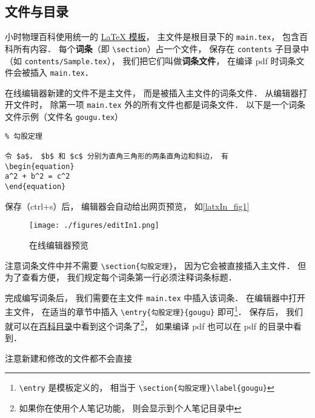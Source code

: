 

\subsection{文件与目录}

小时物理百科使用统一的 \href{https://github.com/MacroUniverse/PhysWiki}{LaTeX 模板}， 主文件是根目录下的 \lstinline|main.tex|， 包含百科所有内容． 每个\textbf{词条}（即 \lstinline|\section|）占一个文件， 保存在 \lstinline|contents| 子目录中 （如 \lstinline|contents/Sample.tex|）， 我们把它们叫做\textbf{词条文件}， 在编译 pdf 时词条文件会被插入 \lstinline|main.tex|．

在线编辑器新建的文件不是主文件， 而是被插入主文件的词条文件． 从编辑器打开文件时， 除第一项 \lstinline|main.tex| 外的所有文件也都是词条文件． 以下是一个词条文件示例（文件名 \lstinline|gougu.tex|）

\begin{lstlisting}
% 勾股定理

令 $a$， $b$ 和 $c$ 分别为直角三角形的两条直角边和斜边， 有
\begin{equation}
a^2 + b^2 = c^2
\end{equation}
\end{lstlisting}
保存（ctrl+s）后， 编辑器会自动给出网页预览， 如\autoref{latxIn_fig1}
\begin{figure}[ht]
\centering
\texttt{[image: ./figures/editIn1.png]}
\caption{在线编辑器预览} \label{editIn_fig1}
\end{figure}

注意词条文件中并不需要 \lstinline|\section{勾股定理}|， 因为它会被直接插入主文件． 但为了查看方便， 我们规定每个词条第一行必须注释词条标题．

完成编写词条后， 我们需要在主文件 \lstinline|main.tex| 中插入该词条． 在编辑器中打开主文件， 在适当的章节中插入 \lstinline|\entry{勾股定理}{gougu}| 即可\footnote{\lstinline|\entry| 是模板定义的， 相当于 \lstinline|\section{勾股定理}\label{gougu}|}． 保存后， 我们就可以在\href{http://wuli.wiki/changed}{百科目录}中看到这个词条了\footnote{如果你在使用个人笔记功能， 则会显示到个人笔记目录中}， 如果编译 pdf 也可以在 pdf 的目录中看到．

注意新建和修改的文件都不会直接
